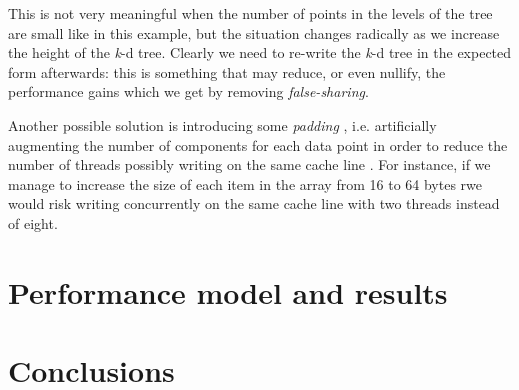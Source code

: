\documentclass{article}
\newcommand{\kdtree}{\emph{k}-d tree}
\begin{document}
This is not very meaningful when the number of points in the levels of the tree
are small like in this example, but the situation changes radically as we
increase the height of the \kdtree{}. Clearly we need to re-write the \kdtree{}
in the expected form afterwards: this is something that may reduce, or even
nullify, the performance gains which we get by removing \emph{false-sharing}.

Another possible solution is introducing some \emph{padding}
\cite{hager2010introduction}, i.e. artificially augmenting the number of
components for each data point in order to reduce the number of threads possibly
writing on the same cache line . For instance, if we manage to increase the size
of each item in the array from 16 to 64 bytes rwe would risk writing
concurrently on the same cache line with two threads instead of eight.

\section{Performance model and results}

\section{Conclusions}


\end{document}
